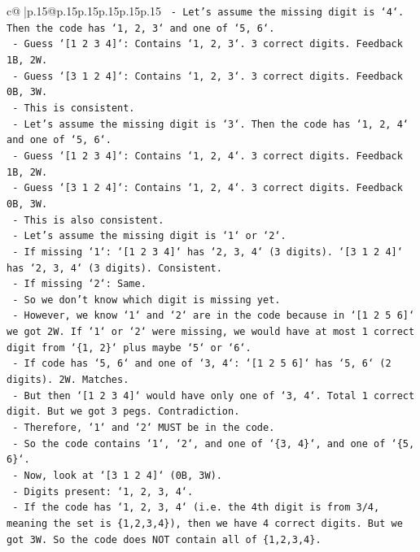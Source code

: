\documentclass{article}
\begin{document}
{\begin{supertabular}{c@{$\;$}|p{.15\linewidth}@{}p{.15\linewidth}p{.15\linewidth}p{.15\linewidth}p{.15\linewidth}p{.15\linewidth}}
{{{\texttt{        {-} Let's assume the missing digit is `4`. Then the code has `1, 2, 3` and one of `5, 6`.} \\
\texttt{            {-} Guess `{[}1 2 3 4{]}`: Contains `1, 2, 3`. 3 correct digits. Feedback 1B, 2W.} \\
\texttt{            {-} Guess `{[}3 1 2 4{]}`: Contains `1, 2, 3`. 3 correct digits. Feedback 0B, 3W.} \\
\texttt{            {-} This is consistent.} \\
\texttt{        {-} Let's assume the missing digit is `3`. Then the code has `1, 2, 4` and one of `5, 6`.} \\
\texttt{            {-} Guess `{[}1 2 3 4{]}`: Contains `1, 2, 4`. 3 correct digits. Feedback 1B, 2W.} \\
\texttt{            {-} Guess `{[}3 1 2 4{]}`: Contains `1, 2, 4`. 3 correct digits. Feedback 0B, 3W.} \\
\texttt{            {-} This is also consistent.} \\
\texttt{        {-} Let's assume the missing digit is `1` or `2`.} \\
\texttt{            {-} If missing `1`: `{[}1 2 3 4{]}` has `2, 3, 4` (3 digits). `{[}3 1 2 4{]}` has `2, 3, 4` (3 digits). Consistent.} \\
\texttt{            {-} If missing `2`: Same.} \\
\texttt{        {-} So we don't know which digit is missing yet.} \\
\texttt{        {-} However, we know `1` and `2` are in the code because in `{[}1 2 5 6{]}` we got 2W. If `1` or `2` were missing, we would have at most 1 correct digit from `\{1, 2\}` plus maybe `5` or `6`.} \\
\texttt{            {-} If code has `5, 6` and one of `3, 4`: `{[}1 2 5 6{]}` has `5, 6` (2 digits). 2W. Matches.} \\
\texttt{            {-} But then `{[}1 2 3 4{]}` would have only one of `3, 4`. Total 1 correct digit. But we got 3 pegs. Contradiction.} \\
\texttt{            {-} Therefore, `1` and `2` MUST be in the code.} \\
\texttt{        {-} So the code contains `1`, `2`, and one of `\{3, 4\}`, and one of `\{5, 6\}`.} \\
\texttt{        {-} Now, look at `{[}3 1 2 4{]}` (0B, 3W).} \\
\texttt{            {-} Digits present: `1, 2, 3, 4`.} \\
\texttt{            {-} If the code has `1, 2, 3, 4` (i.e. the 4th digit is from 3/4, meaning the set is \{1,2,3,4\}), then we have 4 correct digits. But we got 3W. So the code does NOT contain all of \{1,2,3,4\}.} \\
}}}
\end{supertabular}}
\end{document}
